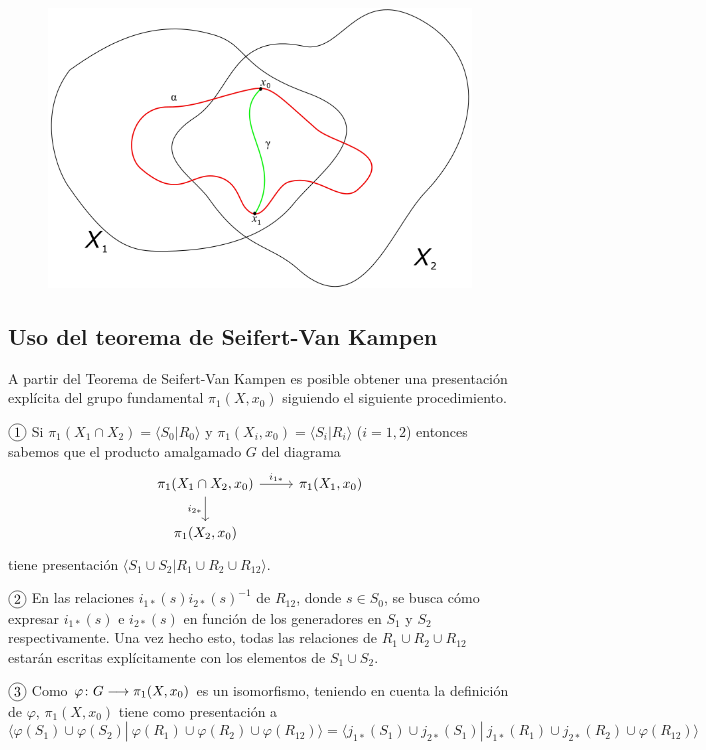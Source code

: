 \documentclass[GTS.tex]{subfiles}
\begin{document}
\begin{figure}[h!]
	\includegraphics[scale=0.4]{text4180}
\end{figure}

\newpage

\subsection{Uso del teorema de Seifert-Van Kampen}

A partir del Teorema de Seifert-Van Kampen es posible obtener una presentación explícita del grupo fundamental $\pi_1(X,x_0)$ siguiendo el siguiente procedimiento.

$\circled{1}$ Si $\pi_1(X_1\cap X_2)=\langle S_0|R_0\rangle$ y $\pi_1(X_i,x_0)=\langle S_i|R_i\rangle$ ($i=1,2$) entonces sabemos que el producto amalgamado $G$ del diagrama
\[
\begin{tikzcd}
\pi_1(X_1\cap X_2,x_0) \ar[r, "i_{1*}"]\arrow[d,"i_{2*} "'] & \pi_1(X_1,x_0)\\
\pi_1(X_2,x_0)
\end{tikzcd}
\]
tiene presentación $\langle S_1\cup S_2 | R_1\cup R_2\cup R_{12}\rangle$.

$\circled{2}$ En las relaciones $i_{1*}(s)i_{2*}(s)^{-1}$ de $R_{12}$, donde $s\in S_0$, se busca cómo expresar $i_{1*}(s)$ e $i_{2*}(s)$ en función de los generadores en $S_1$ y $S_2$ respectivamente. Una vez hecho esto, todas las relaciones de $R_1\cup R_2\cup R_{12}$ estarán escritas explícitamente con los elementos de $S_1\cup S_2$.

$\circled{3}$ Como $\varphi\colon{G}\longrightarrow{\pi_1(X,x_0)}$ es un isomorfismo, teniendo en cuenta la definición de $\varphi$, $\pi_1(X,x_0)$ tiene como presentación a
\[
\langle\varphi(S_1)\cup\varphi(S_2)|\ \varphi(R_1)\cup\varphi(R_2)\cup\varphi(R_{12})\rangle=\langle j_{1*}(S_1)\cup j_{2*}(S_1)|\ j_{1*}(R_1)\cup j_{2*}(R_2)\cup\varphi(R_{12})\rangle
\]
\end{document}
